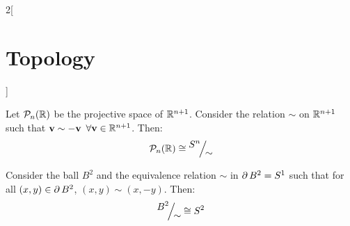 \documentclass[../../../main_math.tex]{subfiles}
\begin{document}
\begin{multicols}{2}[\section{Topology}]
\begin{center}
\begin{minipage}{\linewidth}
      \label{TOP:klein}
    \end{minipage}
  \end{center}
  \begin{proposition}\label{TOP:proj-sim}
    Let $\mathcal{P}_n(\mathbb{R})$ be the projective space of $\mathbb{R}^{n+1}$. Consider the relation $\sim$ on $\mathbb{R}^{n+1}$ such that $\boldsymbol{\mathrm{v}}\sim -\boldsymbol{\mathrm{v}}$ $\forall \boldsymbol{\mathrm{v}}\in\mathbb{R}^{n+1}$. Then: $$\mathcal{P}_n(\RR)\cong\quot{\S^n}{\sim}$$
  \end{proposition}
  \begin{proposition}\label{TOP:circle-sim}
    Consider the ball $B^2$ and the equivalence relation $\sim$ in $\operatorname{\partial} B^2=S^1$ such that for all $(x,y)\in \operatorname{\partial} B^2$, $(x,y)\sim(x,-y)$. Then: $$\quot{B^2}{\sim}\cong \S^2$$
    \begin{center}
      \begin{minipage}{\linewidth}
        \centering
        
        \label{TOP:fig-PS}
      \end{minipage}
    \end{center}
  \end{proposition}

\end{multicols}
\end{document}
